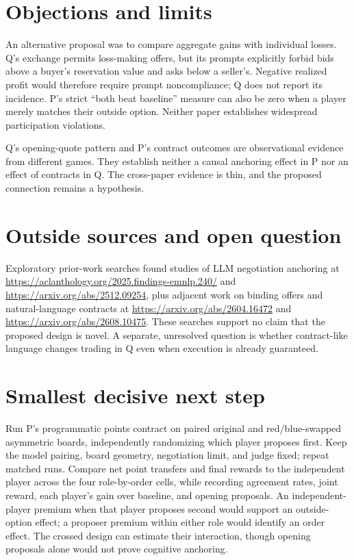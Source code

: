 \documentclass{article}
\begin{document}
\section*{Objections and limits}

An alternative proposal was to compare aggregate gains with individual losses. Q's exchange permits loss-making offers, but its prompts explicitly forbid bids above a buyer's reservation value and asks below a seller's. Negative realized profit would therefore require prompt noncompliance; Q does not report its incidence. P's strict ``both beat baseline'' measure can also be zero when a player merely matches their outside option. Neither paper establishes widespread participation violations. 

Q's opening-quote pattern and P's contract outcomes are observational evidence from different games. They establish neither a causal anchoring effect in P nor an effect of contracts in Q. The cross-paper evidence is thin, and the proposed connection remains a hypothesis. 

\section*{Outside sources and open question}

Exploratory prior-work searches found studies of LLM negotiation anchoring at \url{https://aclanthology.org/2025.findings-emnlp.240/} and \url{https://arxiv.org/abs/2512.09254}, plus adjacent work on binding offers and natural-language contracts at \url{https://arxiv.org/abs/2604.16472} and \url{https://arxiv.org/abs/2608.10475}. These searches support no claim that the proposed design is novel. A separate, unresolved question is whether contract-like language changes trading in Q even when execution is already guaranteed. 

\section*{Smallest decisive next step}

Run P's programmatic points contract on paired original and red/blue-swapped asymmetric boards, independently randomizing which player proposes first. Keep the model pairing, board geometry, negotiation limit, and judge fixed; repeat matched runs. Compare net point transfers and final rewards to the independent player across the four role-by-order cells, while recording agreement rates, joint reward, each player's gain over baseline, and opening proposals. An independent-player premium when that player proposes second would support an outside-option effect; a proposer premium within either role would identify an order effect. The crossed design can estimate their interaction, though opening proposals alone would not prove cognitive anchoring. 
\end{document}
